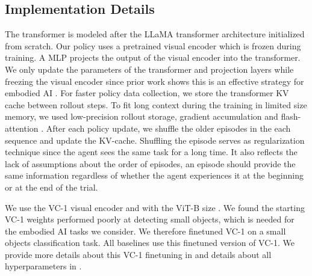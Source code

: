 \subsection{Implementation Details}
\label{sec:impl-details} 
The transformer is modeled after the LLaMA transformer architecture \citep{touvron2023llamaoa} initialized from scratch. Our policy uses a pretrained visual encoder which is frozen during training. A MLP projects the output of the visual encoder into the transformer.
We only update the parameters of the transformer and projection layers while freezing the visual encoder since prior work shows this is an effective strategy for embodied AI \citep{khandelwal2022simple,vc2023}.
For faster policy data collection, we store the transformer KV cache between rollout steps. 
To fit long context during the training in limited size memory, we used low-precision rollout storage, gradient accumulation \citep{huang2019gpipe} and flash-attention \citep{dao2023flashattention2}.
After each policy update, we shuffle the older episodes in the each sequence and update the KV-cache. 
Shuffling the episode serves as regularization technique since the agent sees the same task for a long time. It also reflects the lack of assumptions about the order of episodes, an episode should provide the same information regardless of whether the agent experiences it at the beginning or at the end of the trial.

We use the VC-1 visual encoder and with the ViT-B size \citep{vc2023}. 
We found the starting VC-1 weights performed poorly at detecting small objects, which is needed for the embodied AI tasks we consider.
We therefore finetuned VC-1 on a small objects classification task.
All baselines use this finetuned version of VC-1.
We provide more details about this VC-1 finetuning in  and details about all hyperparameters in .




